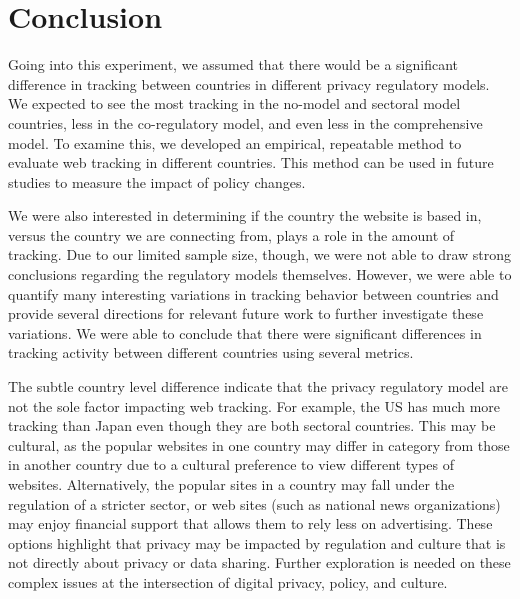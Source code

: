 \documentclass[conference]{IEEEtran}
\begin{document}
\section{Conclusion}
Going into this experiment, we assumed that there would be a significant difference in tracking between countries in different privacy regulatory models. We expected to see the most tracking in the no-model and sectoral model countries, less in the co-regulatory model, and even less in the comprehensive model. To examine this, we developed an empirical, repeatable method to evaluate web tracking in different countries.  This method can be used in future studies to measure the impact of policy changes.

We were also interested in determining if the country the website is based in, versus the country we are connecting from, plays a role in the amount of tracking. Due to our limited sample size, though, we were not able to draw strong conclusions regarding the regulatory models themselves. However, we were able to quantify many interesting variations in tracking behavior between countries and provide several directions for relevant future work to further investigate these variations.  We were able to conclude that there were significant differences in tracking activity between different countries using several metrics. 

The subtle country level difference indicate that the privacy regulatory model are not the sole factor impacting web tracking.  For example, the US has much more tracking than Japan even though they are both sectoral countries.  This may be cultural, as the popular websites in one country may differ in category from those in another country due to a cultural preference to view different types of websites. Alternatively, the popular sites in a country may fall under the regulation of a stricter sector, or web sites (such as national news organizations) may enjoy financial support that allows them to rely less on advertising. These options highlight that privacy may be impacted by regulation and culture that is not directly about privacy or data sharing. Further exploration is needed on these complex issues at the intersection of digital privacy, policy, and culture. 



\ifCLASSOPTIONcaptionsoff
  \newpage
\fi
\end{document}
